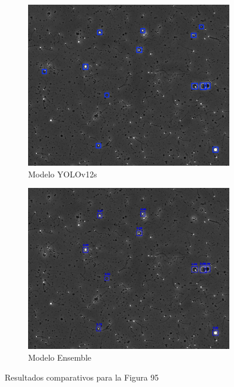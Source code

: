 \documentclass[12pt,a4paper,onecolumn,oneside]{report}
\begin{document}
\begin{figure}[H]
  \vspace{0.3cm} 
  
  \begin{subfigure}[b]{0.48\textwidth}
    \centering
    \includegraphics[width=\textwidth]{figuras/evaluacion_cualitativa/95/95_v12.jpg}
    \caption{Modelo YOLOv12s}
    \label{fig:yolov12s_image_95}
  \end{subfigure}
  \hfill
  \begin{subfigure}[b]{0.48\textwidth}
    \centering
    \includegraphics[width=\textwidth]{figuras/evaluacion_cualitativa/95/95_ensemble.jpg}
    \caption{Modelo Ensemble}
    \label{fig:ensemble_image_95}
  \end{subfigure}
  
  \caption{Resultados comparativos para la Figura 95}
  \label{fig:95}
\end{figure}
\end{document}
